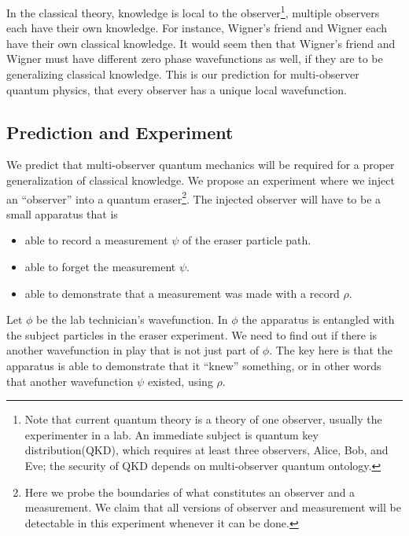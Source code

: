 \documentclass[12pt,a4paper]{article}
\theoremstyle{myrule}
\theoremstyle{postulate}
\theoremstyle{definition}
\begin{document}
In the classical theory, knowledge is local to the observer\footnote{Note that current quantum theory is a theory of one observer, usually the experimenter in a lab.  An immediate subject is quantum key distribution(QKD), which requires at least three observers, Alice, Bob, and Eve; the security of QKD depends on multi-observer quantum ontology.}, multiple observers each have their own knowledge.  For instance, Wigner's friend and Wigner each have their own classical knowledge.  It would seem then that Wigner's friend and Wigner must have different zero phase wavefunctions as well, if they are to be generalizing classical knowledge.  This is our prediction for multi-observer quantum physics, that every observer has a unique local wavefunction. 

\subsection{Prediction and Experiment}

We predict that multi-observer quantum mechanics will be required for a proper generalization of classical knowledge.  We propose an experiment where we inject an ``observer'' into a quantum eraser\footnote{Here we probe the boundaries of what constitutes an observer and a measurement.  We claim that all versions of observer and measurement will be detectable in this experiment whenever it can be done.}.  The injected observer will have to be a small apparatus that is
\begin{itemize}
   \item able to record a measurement $\psi$ of the eraser particle path.
   \item able to forget the measurement $\psi$.
   \item able to demonstrate that a measurement was made with a record $\rho$.
\end{itemize}
Let $\phi$ be the lab technician's wavefunction.  In $\phi$ the apparatus is entangled with the subject particles in the eraser experiment.  We need to find out if there is another wavefunction in play that is not just part of $\phi$.  The key here is that the apparatus is able to demonstrate that it ``knew'' something, or in other words that another wavefunction $\psi$ existed, using $\rho$.
\end{document}

